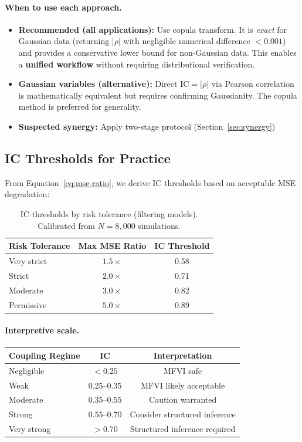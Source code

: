 \documentclass[10pt]{article} %
\theoremstyle{plain}
\theoremstyle{definition}
\newcommand{\IC}{\mathrm{IC}}  %
\begin{document}
\paragraph{When to use each approach.}
\begin{itemize}[nosep]
    \item \textbf{Recommended (all applications):} Use copula transform. It is \emph{exact} for Gaussian data (returning $|\rho|$ with negligible numerical difference $<0.001$) and provides a conservative lower bound for non-Gaussian data. This enables a \textbf{unified workflow} without requiring distributional verification.
    \item \textbf{Gaussian variables (alternative):} Direct $\IC = |\rho|$ via Pearson correlation is mathematically equivalent but requires confirming Gaussianity. The copula method is preferred for generality.
    \item \textbf{Suspected synergy:} Apply two-stage protocol (Section~\ref{sec:synergy})
\end{itemize}

\subsection{IC Thresholds for Practice}
\label{sec:thresholds}

From Equation~\ref{eq:mse-ratio}, we derive IC thresholds based on acceptable MSE degradation:

\begin{table}[!htbp]
\centering
\caption{IC thresholds by risk tolerance (filtering models). Calibrated from $N = 8{,}000$ simulations.}
\label{tab:ic-thresholds}
\begin{tabular}{lcc}
\toprule
Risk Tolerance & Max MSE Ratio & IC Threshold \\
\midrule
Very strict & $1.5\times$ & 0.58 \\
Strict & $2.0\times$ & 0.71 \\
Moderate & $3.0\times$ & 0.82 \\
Permissive & $5.0\times$ & 0.89 \\
\bottomrule
\end{tabular}
\end{table}

\paragraph{Interpretive scale.}
\begin{table}[!htbp]
\centering
\begin{tabular}{lcc}
\toprule
Coupling Regime & IC & Interpretation \\
\midrule
Negligible & $< 0.25$ & MFVI safe \\
Weak & $0.25$--$0.35$ & MFVI likely acceptable \\
Moderate & $0.35$--$0.55$ & Caution warranted \\
Strong & $0.55$--$0.70$ & Consider structured inference \\
Very strong & $> 0.70$ & Structured inference required \\
\bottomrule
\end{tabular}
\end{table}
\end{document}
